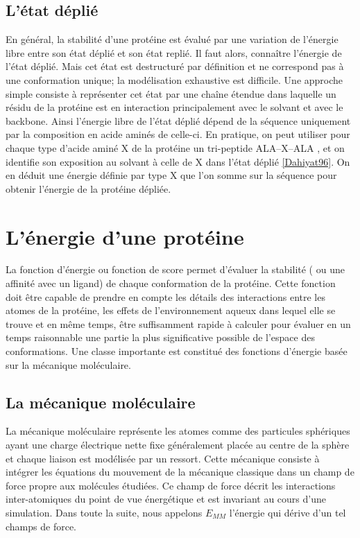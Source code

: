 \subsection{L'état déplié }
En général, la stabilité d'une protéine est évalué par une variation de l'énergie libre entre son état déplié et son état replié. Il faut alors, connaître l'énergie de l'état déplié. Mais cet état est destructuré par définition et ne correspond pas à une conformation unique; la modélisation exhaustive est difficile. Une approche simple consiste à représenter cet état par une chaîne étendue dans laquelle un résidu de la protéine est en interaction principalement avec le solvant et avec le backbone. Ainsi l'énergie libre de l'état déplié dépend de la séquence uniquement par la composition en acide aminés de celle-ci. En pratique, on peut utiliser pour chaque type d'acide aminé X de la protéine  un tri-peptide ALA--X--ALA , et on identifie son exposition au solvant à celle de X dans l'état déplié \ref{Dahiyat96}. On en déduit une énergie définie par type X que l'on somme sur la séquence pour obtenir l'énergie de la protéine dépliée. 

\section{L'énergie d'une protéine}

La fonction d'énergie ou fonction de score permet d'évaluer la stabilité ( ou une affinité avec un ligand) de chaque conformation de la protéine. Cette fonction doit être capable de prendre en compte les détails des interactions entre les atomes de la protéine, les effets de l'environnement aqueux  dans lequel elle se trouve et en même temps, être suffisamment rapide à calculer pour évaluer en un temps raisonnable une partie la plus significative possible de l'espace des conformations. Une classe importante est constitué des fonctions d'énergie basée sur la mécanique moléculaire.

\subsection{La mécanique moléculaire}
\label{sub:mecamol}
La mécanique moléculaire représente les atomes comme des particules sphériques ayant une charge électrique nette fixe généralement placée au centre de la sphère et chaque liaison est modélisée par un ressort.
Cette mécanique consiste à intégrer les équations du mouvement de la mécanique classique dans un champ de force propre aux molécules étudiées. Ce champ de force décrit les interactions inter-atomiques du point de vue énergétique et est invariant au cours d'une simulation.
Dans toute la suite, nous appelons $E_{MM}$ l'énergie qui dérive d'un tel champs de force.

